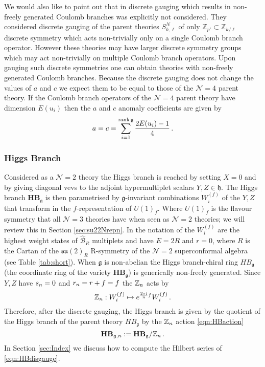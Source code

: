 \documentclass[main.tex]{subfiles}
\begin{document}
We would also like to point out that in \cite{Aharony:2016kai} discrete gauging which results in non-freely generated Coulomb branches was explicitly not considered. They considered discrete gauging of the parent theories $S_{k,\ell}^N$ of only $\mathbb{Z}_{p'}\subset\mathbb{Z}_{k/\ell}$ discrete symmetry which acts non-trivially only on a single Coulomb branch operator. However these theories may have larger discrete symmetry groups which may act non-trivially on multiple Coulomb branch operators. Upon gauging such discrete symmetries one can obtain theories with non-freely generated Coulomb branches.
Because the discrete gauging does not change the values of $a$ and $c$ we expect them to be equal to those of the $\mathcal{N}=4$ parent theory. If the Coulomb branch operators of the $\mathcal{N}=4$ parent theory have dimension $E(u_i)$ then the $a$ and $c$ anomaly coefficients are given by \cite{Argyres:2007tq,Shapere:2008zf}
\begin{equation}\label{eqn:discgaugeac}
a=c=\sum_{i=1}^{\operatorname{rank} \mathfrak{g}}\frac{2E(u_i)-1}{4}\,.
\end{equation}

\subsubsection{Higgs Branch}
Considered as a $\mathcal{N}=2$ theory the Higgs branch is reached by setting $X=0$ and by giving diagonal vevs to the adjoint hypermultiplet scalars $Y,Z\in\mathfrak{h}$. The Higgs branch $\mathbf{HB}_{\mathfrak{g}}$ is then parametrised by $\mathfrak{g}$-invariant combinations $W_{i}^{(f)}$ of the $Y,Z$ that transform in the $f$-representation of $U(1)_f$. Where $U(1)_f$ is the flavour symmetry that all $\mathcal{N}=3$ theories have when seen as $\mathcal{N}=2$ theories; we will review this in Section \ref{sec:su22Nrepn}. In the notation of \cite{DolanOsborn} the $W_{i}^{(f)}$ are the highest weight states of $\hat{\mathcal{B}}_R$ multiplets and have $E=2R$ and $r=0$, where $R$ is the Cartan of the $\mathfrak{su}(2)_R$ R-symmetry of the $\mathcal{N}=2$ superconformal algebra (see Table \ref{tab:short}). When $\mathfrak{g}$ is non-abelian the Higgs branch-chiral ring $HB_{\mathfrak{g}}$ (the coordinate ring of the variety $\mathbf{HB}_{\mathfrak{g}}$) is generically non-freely generated. Since $Y,Z$ have $s_{n}=0$ and $r_{n}=r+f=f$ the $\mathbb{Z}_{n}$ acts by
\begin{equation}\label{eqn:HBaction}
\mathbb{Z}_{n}:W_{i}^{(f)}\mapsto e^{\frac{2\pi\mathrm{i}}{n}f}W_{i}^{(f)}\,.
\end{equation}
Therefore, after the discrete gauging, the Higgs branch is given by the quotient of the Higgs branch of the parent theory $HB_{\mathfrak{g}}$ by the $\mathbb{Z}_{n}$ action \eqref{eqn:HBaction}
\begin{equation}\label{eqn:HBdisgauge}
\mathbf{HB}_{\mathfrak{g},n}:=\mathbf{HB}_{\mathfrak{g}}/\mathbb{Z}_{n}\,.
\end{equation}
In Section \ref{sec:Index} we discuss how to compute the Hilbert series of \eqref{eqn:HBdisgauge}.
\end{document}

